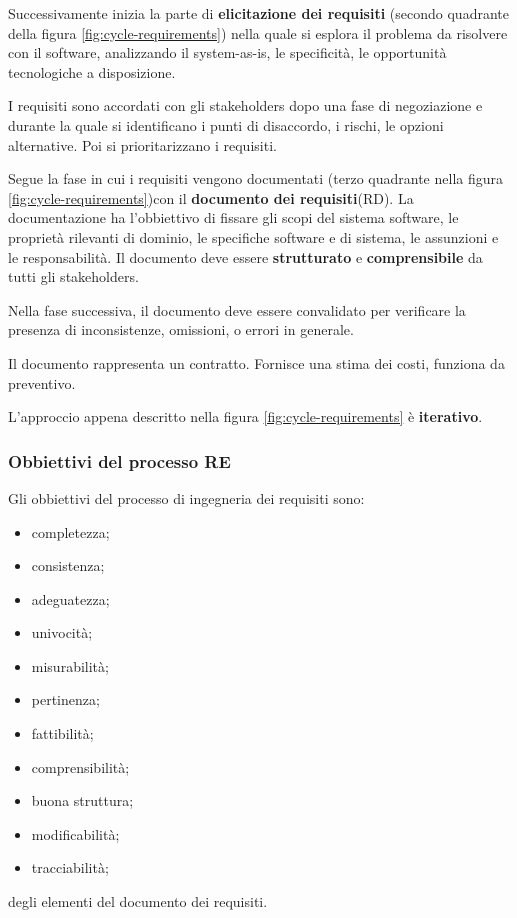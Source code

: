 \documentclass[italian]{article}
\begin{document}
		 Successivamente inizia la parte di \textbf{elicitazione dei requisiti} (secondo quadrante della figura \ref{fig:cycle-requirements}) nella quale si esplora il problema da risolvere con il software, analizzando il system-as-is, le specificità, le opportunità tecnologiche a disposizione.

		 I requisiti sono accordati con gli stakeholders dopo una fase di negoziazione e durante la quale si identificano i punti di disaccordo, i rischi, le opzioni alternative. Poi si prioritarizzano i requisiti.

		 Segue la fase in cui i requisiti vengono documentati (terzo quadrante nella figura \ref{fig:cycle-requirements})con il \textbf{documento dei requisiti}(RD). La documentazione ha l'obbiettivo di fissare gli scopi del sistema software, le proprietà rilevanti di dominio, le specifiche software e di sistema, le assunzioni e le responsabilità. Il documento deve essere \textbf{strutturato} e \textbf{comprensibile} da tutti gli stakeholders.

		 Nella fase successiva, il documento deve essere convalidato per verificare la presenza di inconsistenze, omissioni, o errori in generale.

		 Il documento rappresenta un contratto. Fornisce una stima dei costi, funziona da preventivo.

		 L'approccio appena descritto nella figura \ref{fig:cycle-requirements} è \textbf{iterativo}.
		 \subsubsection{Obbiettivi del processo RE}
		Gli obbiettivi del processo di ingegneria dei requisiti sono:
		\begin{itemize}

			\item completezza;
			\item consistenza;
			\item adeguatezza;
			\item univocità;
			\item misurabilità;
			\item pertinenza;
			\item fattibilità;
			\item comprensibilità;
			\item buona struttura;
			\item modificabilità;
			\item tracciabilità;
		\end{itemize}
		degli elementi del documento dei requisiti.
\end{document}
